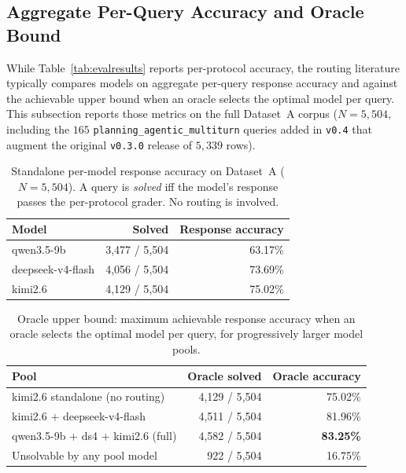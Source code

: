 \documentclass[11pt,a4paper]{article}
\begin{document}
\subsection{Aggregate Per-Query Accuracy and Oracle Bound}\label{sec:eval-oraclebound}

While Table~\ref{tab:evalresults} reports per-protocol accuracy, the routing
literature typically compares models on aggregate per-query response accuracy
and against the achievable upper bound when an oracle selects the optimal
model per query. This subsection reports those metrics on the full Dataset~A
corpus ($N{=}5{,}504$, including the $165$ \texttt{planning\_agentic\_multiturn}
queries added in \texttt{v0.4} that augment the original \texttt{v0.3.0}
release of $5{,}339$ rows).

\begin{table}[ht]
\centering
\caption{Standalone per-model response accuracy on Dataset~A
($N{=}5{,}504$). A query is \emph{solved} iff the model's response
passes the per-protocol grader. No routing is involved.}
\label{tab:standalone_response_accuracy}
\small
\begin{tabular}{l r r}
\toprule
\textbf{Model} & \textbf{Solved} & \textbf{Response accuracy} \\
\midrule
qwen3.5-9b        & 3{,}477 / 5{,}504 & 63.17\% \\
deepseek-v4-flash & 4{,}056 / 5{,}504 & 73.69\% \\
kimi2.6           & 4{,}129 / 5{,}504 & 75.02\% \\
\bottomrule
\end{tabular}
\end{table}

\begin{table}[ht]
\centering
\caption{Oracle upper bound: maximum achievable response accuracy when an
oracle selects the optimal model per query, for progressively larger model
pools.}
\label{tab:oracle_bound}
\small
\begin{tabular}{l r r}
\toprule
\textbf{Pool} & \textbf{Oracle solved} & \textbf{Oracle accuracy} \\
\midrule
kimi2.6 standalone (no routing)        & 4{,}129 / 5{,}504 & 75.02\% \\
kimi2.6 $+$ deepseek-v4-flash          & 4{,}511 / 5{,}504 & 81.96\% \\
qwen3.5-9b $+$ ds4 $+$ kimi2.6 (full)  & 4{,}582 / 5{,}504 & \textbf{83.25\%} \\
\midrule
Unsolvable by any pool model           & 922 / 5{,}504    & 16.75\% \\
\bottomrule
\end{tabular}
\end{table}
\end{document}
